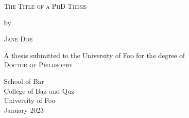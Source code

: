 \begin{titlepage}
\begin{center}

  \large %

  {\Huge\textsc{The Title of a PhD Thesis}\par}


  by


  {\huge\textsc{Jane Doe}}


  A thesis submitted to the University of Foo for the degree of\\
  \textsc{Doctor of Philosophy}

  \vfill

  \flushright
  School of Bar \\
  College of Baz and Quz \\
  University of Foo \\
  January 2023

\end{center}
\end{titlepage}